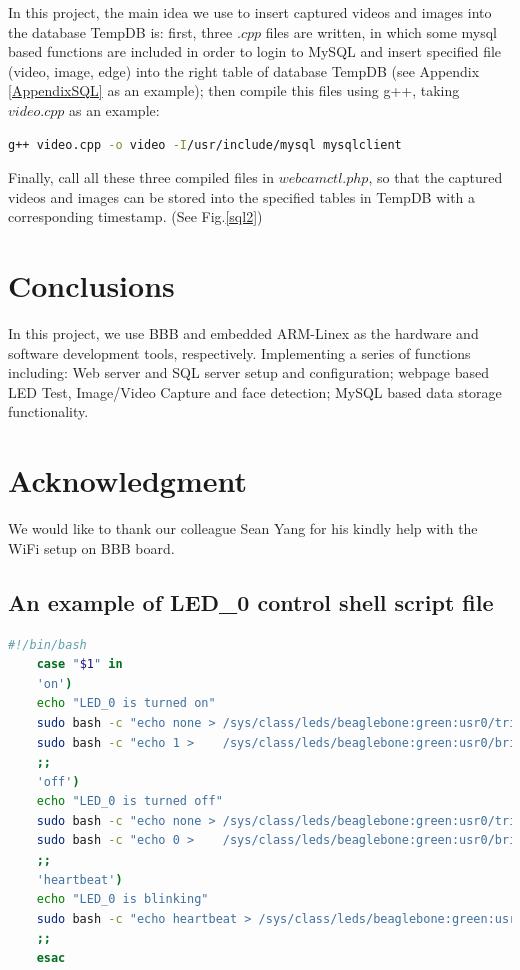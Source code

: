 \documentclass[12pt,journal,draftclsnofoot,onecolumn]{IEEEtran}
\begin{document}
In this project, the main idea we use to insert captured videos and images into the database TempDB is: first, three $.cpp$ files are written, in which some mysql based functions are included in order to login to MySQL \cite{MySQL} and insert specified file (video, image, edge) into the right table of database TempDB (see Appendix \ref{AppendixSQL} as an example); then compile this files using g++, taking $video.cpp$ as an example:

\begin{lstlisting}[language={bash}]
g++ video.cpp -o video -I/usr/include/mysql mysqlclient
\end{lstlisting}
Finally, call all these three compiled files in $webcamctl.php$, so that the captured videos and images can be stored into the specified tables in TempDB with a corresponding timestamp. (See Fig.\ref{sql2})

\section{Conclusions}\label{Con}
In this project, we use BBB and embedded ARM-Linex as the hardware and software development tools, respectively. Implementing a series of functions including: Web server and SQL server setup and configuration; webpage based LED Test, Image/Video Capture and face detection;  MySQL based data storage functionality.

\section*{Acknowledgment}
We would like to thank our colleague Sean Yang  for his kindly help with the WiFi setup on BBB board.



\clearpage

\appendix
    \subsection{An example of LED\_0 control shell script file}\label{AppendixLED}
    \begin{lstlisting}[language={bash}]
    #!/bin/bash
    case "$1" in
    'on')
    echo "LED_0 is turned on"
    sudo bash -c "echo none > /sys/class/leds/beaglebone:green:usr0/trigger"
    sudo bash -c "echo 1 >    /sys/class/leds/beaglebone:green:usr0/brightness"
    ;;
    'off')
    echo "LED_0 is turned off"
    sudo bash -c "echo none > /sys/class/leds/beaglebone:green:usr0/trigger"
    sudo bash -c "echo 0 >    /sys/class/leds/beaglebone:green:usr0/brightness"
    ;;
    'heartbeat')
    echo "LED_0 is blinking"
    sudo bash -c "echo heartbeat > /sys/class/leds/beaglebone:green:usr0/trigger"
    ;;
    esac
    \end{lstlisting}
    
\end{document}
